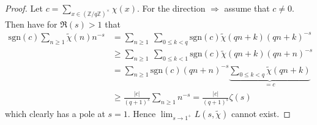 \documentclass{scrartcl}
\newcommand{\Z}{\mathbb{Z}}
\newcommand{\units}{\times}
\newcommand{\sgn}{\mathrm{sgn}}
\theoremstyle{definition}
\begin{document}
\begin{proof}
    Let $c = \sum_{x \in (\Z/q\Z)^\units} \chi(x)$.
    For the direction $\Rightarrow$ assume that $c \neq 0$.
    Then have for $\Re(s) > 1$ that
    \begin{align*}
        \sgn(c) \sum_{n \geq 1} \tilde{\chi}(n) n^{-s} &= \sum_{n \geq 1} \ \sum_{0 \leq k < q} \sgn(c) \tilde{\chi}(qn + k) (qn + k)^{-s} \\
        &\geq \sum_{n \geq 1} \ \sum_{0 \leq k < 1}\sgn(c) \tilde{\chi}(qn + k) (qn + n)^{-s} \\
        &= \sum_{n \geq 1} \sgn(c) (qn + n)^{-s} \underbrace{\sum_{0 \leq k < q} \tilde{\chi}(qn + k)}_{= c} \\
        &\geq \frac {|c|} {(q + 1)^s} \sum_{n \geq 1} n^{-s} = \frac {|c|} {(q + 1)^s} \zeta(s)
    \end{align*}
    which clearly has a pole at $s = 1$. Hence $\lim_{s \to 1^+} L(s, \tilde{\chi})$ cannot exist.


\end{proof}
\end{document}
